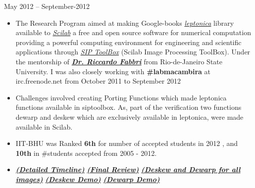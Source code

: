 \documentclass[margin,line]{res}
\begin{document}
\begin{resume}
\hfill {May 2012 -- September-2012}
\begin{itemize} %
  \setlength{\itemsep}{0.01pt}
  \setlength{\parskip}{0pt}
  \setlength{\parsep}{0pt}
\item The Research Program aimed at making Google-books \href{https://code.google.com/p/leptonica/}{\em leptonica} library available to \href{http://www.scilab.org/scilab/about}{\em Scilab} a free and open source software for numerical computation providing a powerful computing environment for engineering and scientific applications through \href{http://siptoolbox.sourceforge.net/}{\em SIP ToolBox} (Scilab Image Processing ToolBox). Under the mentorship of \href{http://www.lems.brown.edu/~rfabbri/}{\em {\bf Dr. Riccardo Fabbri}}  from Rio-de-Janeiro State University. I was also closely working with {\bf \#labmacambira} at irc.freenode.net from October 2011 to September 2012
\item Challenges involved creating Porting Functions which made leptonica functions available in siptoolbox. As, part of the verification two functions dewarp and deskew which are exclusively available in leptonica, were made available in Scilab. 
\item IIT-BHU was Ranked {\bf 6th} for number of accepted students in 2012 , and {\bf 10th} in \#students accepted from 2005 - 2012.
\item \href{http://wiki.scilab.org/Contributor-Pallan-Madhavan-GSOC2012}{\em {\bf (Detailed Timeline)}}
\href{http://www.scilab.org/projects/gsoc/2012/201211292}{\em {\bf (Final Review)}}
\href{http://vimeo.com/47705781}{\em {\bf (Deskew and Dewarp for all images)}}
\href{http://vimeo.com/47475970}{\em {\bf (Deskew Demo)}}
\href{http://vimeo.com/47705325}{\em {\bf (Dewarp Demo)}}

\end{itemize}
\end{resume}
\end{document}
